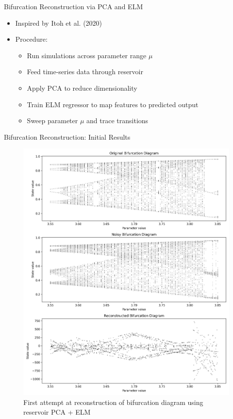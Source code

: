 \documentclass{beamer}
\begin{document}
\begin{frame}{Bifurcation Reconstruction via PCA and ELM}
\begin{itemize}
\item Inspired by Itoh et al. (2020)
\item Procedure:
    \begin{itemize}
    \item Run simulations across parameter range $\mu$
    \item Feed time-series data through reservoir
    \item Apply PCA to reduce dimensionality
    \item Train ELM regressor to map features to predicted output
    \item Sweep parameter $\mu$ and trace transitions
    \end{itemize}
\end{itemize}
\end{frame}

\begin{frame}{Bifurcation Reconstruction: Initial Results}
\begin{figure}
\centering
\includegraphics[width=1\linewidth]{figures/bd_reconstruction_elm.png}
\caption{First attempt at reconstruction of bifurcation diagram using reservoir PCA + ELM}
\end{figure}
\end{frame}
\end{document}
